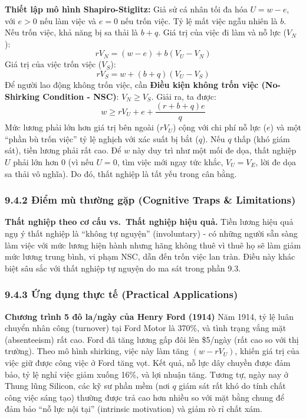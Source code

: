 \documentclass[
]{article}
\begin{document}
\textbf{Thiết lập mô hình Shapiro-Stiglitz:} Giả sử cá nhân tối đa hóa
\(U = w - e\), với \(e>0\) nếu làm việc và \(e=0\) nếu trốn việc. Tỷ lệ
mất việc ngẫu nhiên là \(b\). Nếu trốn việc, khả năng bị sa thải là
\(b + q\). Giá trị của việc đi làm và nỗ lực (\(V_N\)):
\[ rV_N = (w - e) + b(V_U - V_N) \] Giá trị của việc trốn việc
(\(V_S\)): \[ rV_S = w + (b + q)(V_U - V_S) \] Để người lao động không
trốn việc, cần \textbf{Điều kiện không trốn việc (No-Shirking Condition
- NSC)}: \(V_N \geq V_S\). Giải ra, ta được:
\[ w \geq rV_U + e + \frac{(r+b+q)e}{q} \] Mức lương phải lớn hơn giá
trị bên ngoài (\(rV_U\)) cộng với chi phí nỗ lực (\(e\)) và một ``phần
bù trốn việc'' tỷ lệ nghịch với xác suất bị bắt (\(q\)). Nếu \(q\) thấp
(khó giám sát), tiền lương phải rất cao. Để \(w\) này duy trì như một
mối đe dọa, thất nghiệp \(U\) phải lớn hơn 0 (vì nếu \(U=0\), tìm việc
mới ngay tức khắc, \(V_U = V_E\), lời đe dọa sa thải vô nghĩa). Do đó,
thất nghiệp là tất yếu trong cân bằng.

\subsubsection{9.4.2 Điểm mù thường gặp (Cognitive Traps \&
Limitations)}\label{ux111iux1ec3m-muxf9-thux1b0ux1eddng-gux1eb7p-cognitive-traps-limitations-72}

\textbf{Thất nghiệp theo cơ cấu vs.~Thất nghiệp hiệu quả.} Tiền lương
hiệu quả ngụ ý thất nghiệp là ``không tự nguyện'' (involuntary) - có
những người sẵn sàng làm việc với mức lương hiện hành nhưng hãng không
thuê vì thuê họ sẽ làm giảm mức lương trung bình, vi phạm NSC, dẫn đến
trốn việc lan tràn. Điều này khác biệt sâu sắc với thất nghiệp tự nguyện
do ma sát trong phần 9.3.

\subsubsection{9.4.3 Ứng dụng thực tế (Practical
Applications)}\label{ux1ee9ng-dux1ee5ng-thux1ef1c-tux1ebf-practical-applications-36}

\textbf{Chương trình 5 đô la/ngày của Henry Ford (1914)} Năm 1914, tỷ lệ
luân chuyển nhân công (turnover) tại Ford Motor là 370\%, và tình trạng
vắng mặt (absenteeism) rất cao. Ford đã tăng lương gấp đôi lên \$5/ngày
(rất cao so với thị trường). Theo mô hình shirking, việc này làm tăng
\((w - rV_U)\), khiến giá trị của việc giữ được công việc ở Ford tăng
vọt. Kết quả, nỗ lực dây chuyền được đảm bảo, tỷ lệ nghỉ việc giảm xuống
16\%, và lợi nhuận tăng. Tương tự, ngày nay ở Thung lũng Silicon, các kỹ
sư phần mềm (nơi \(q\) giám sát rất khó do tính chất công việc sáng tạo)
thường được trả cao hơn nhiều so với mặt bằng chung để đảm bảo ``nỗ lực
nội tại'' (intrinsic motivation) và giảm rò rỉ chất xám.
\end{document}
